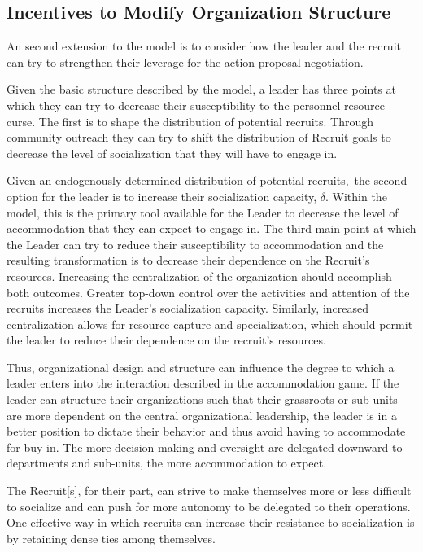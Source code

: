 \subsection{Incentives to Modify Organization Structure}

An second extension to the model is to consider how the leader and the recruit can try to strengthen their leverage for the action proposal 
negotiation. 

Given the  basic structure described by the model, a leader has three points at which they can try to decrease their susceptibility to the personnel resource curse. The first is to shape the distribution of potential recruits. Through community outreach they can try to shift the distribution of Recruit goals to decrease the level of socialization that they will have to engage in. 

Given an endogenously-determined distribution of potential recruits,\ the second option for the leader is to increase their socialization capacity, $\delta$. Within the model, this is the primary tool available for the Leader to decrease the level of accommodation that they can expect to engage in. The third main point at which the Leader can try to reduce their susceptibility to accommodation and the resulting transformation is to decrease their dependence on the Recruit's resources. Increasing the centralization of the organization should accomplish both outcomes. Greater top-down control over the activities and attention of the recruits increases the Leader's socialization capacity. Similarly, increased centralization allows for resource capture and specialization, which should permit the leader to reduce their dependence on the recruit's resources.

Thus, organizational design and structure can influence the degree to which a leader enters into the interaction described in the accommodation game.  If the leader can structure their organizations such that their grassroots or sub-units are more dependent on the central organizational leadership, the leader is in a better position to dictate their behavior and thus avoid having to accommodate for buy-in. The more decision-making and oversight are delegated downward to departments and sub-units, the more accommodation to expect. 

The Recruit[s], for their part, can strive to make themselves more or less difficult to socialize and can push for more autonomy to be delegated to their operations. One effective way in which recruits can increase their resistance to socialization is by retaining dense ties among themselves.

